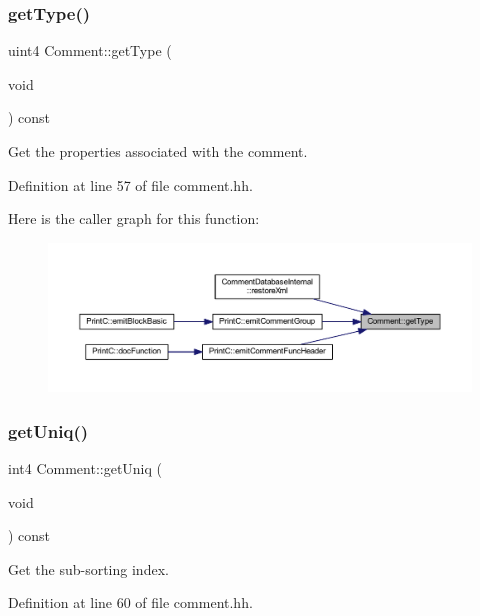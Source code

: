 \subsubsection{\texorpdfstring{getType()}{getType()}}
{\footnotesize\ttfamily uint4 Comment\+::get\+Type (\begin{DoxyParamCaption}\item[{void}]{ }\end{DoxyParamCaption}) const\hspace{0.3cm}{\ttfamily [inline]}}



Get the properties associated with the comment. 



Definition at line 57 of file comment.\+hh.

Here is the caller graph for this function\+:
\nopagebreak
\begin{figure}[H]
\begin{center}
\leavevmode
\includegraphics[width=350pt]{class_comment_ab9f9f0db0645eef88a8259c34f414102_icgraph}
\end{center}
\end{figure}
\mbox{\label{class_comment_aeff445ce0114bebb017213c4abfe0086}} 
\subsubsection{\texorpdfstring{getUniq()}{getUniq()}}
{\footnotesize\ttfamily int4 Comment\+::get\+Uniq (\begin{DoxyParamCaption}\item[{void}]{ }\end{DoxyParamCaption}) const\hspace{0.3cm}{\ttfamily [inline]}}



Get the sub-\/sorting index. 



Definition at line 60 of file comment.\+hh.

